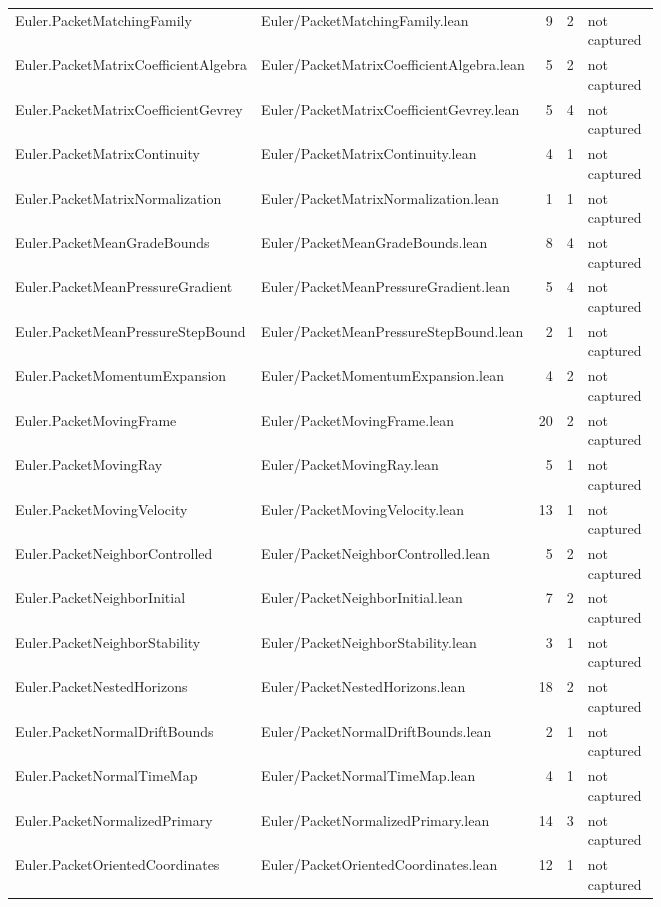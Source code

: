 \documentclass[10pt]{article}
\begin{document}
\begin{longtable}{p{0.28\linewidth}p{0.27\linewidth}r r p{0.20\linewidth}}
Euler.PacketMatchingFamily & Euler/PacketMatchingFamily.lean & 9 & 2 & not captured\\
Euler.PacketMatrixCoefficientAlgebra & Euler/PacketMatrixCoefficientAlgebra.lean & 5 & 2 & not captured\\
Euler.PacketMatrixCoefficientGevrey & Euler/PacketMatrixCoefficientGevrey.lean & 5 & 4 & not captured\\
Euler.PacketMatrixContinuity & Euler/PacketMatrixContinuity.lean & 4 & 1 & not captured\\
Euler.PacketMatrixNormalization & Euler/PacketMatrixNormalization.lean & 1 & 1 & not captured\\
Euler.PacketMeanGradeBounds & Euler/PacketMeanGradeBounds.lean & 8 & 4 & not captured\\
Euler.PacketMeanPressureGradient & Euler/PacketMeanPressureGradient.lean & 5 & 4 & not captured\\
Euler.PacketMeanPressureStepBound & Euler/PacketMeanPressureStepBound.lean & 2 & 1 & not captured\\
Euler.PacketMomentumExpansion & Euler/PacketMomentumExpansion.lean & 4 & 2 & not captured\\
Euler.PacketMovingFrame & Euler/PacketMovingFrame.lean & 20 & 2 & not captured\\
Euler.PacketMovingRay & Euler/PacketMovingRay.lean & 5 & 1 & not captured\\
Euler.PacketMovingVelocity & Euler/PacketMovingVelocity.lean & 13 & 1 & not captured\\
Euler.PacketNeighborControlled & Euler/PacketNeighborControlled.lean & 5 & 2 & not captured\\
Euler.PacketNeighborInitial & Euler/PacketNeighborInitial.lean & 7 & 2 & not captured\\
Euler.PacketNeighborStability & Euler/PacketNeighborStability.lean & 3 & 1 & not captured\\
Euler.PacketNestedHorizons & Euler/PacketNestedHorizons.lean & 18 & 2 & not captured\\
Euler.PacketNormalDriftBounds & Euler/PacketNormalDriftBounds.lean & 2 & 1 & not captured\\
Euler.PacketNormalTimeMap & Euler/PacketNormalTimeMap.lean & 4 & 1 & not captured\\
Euler.PacketNormalizedPrimary & Euler/PacketNormalizedPrimary.lean & 14 & 3 & not captured\\
Euler.PacketOrientedCoordinates & Euler/PacketOrientedCoordinates.lean & 12 & 1 & not captured\\

\end{longtable}
\end{document}
